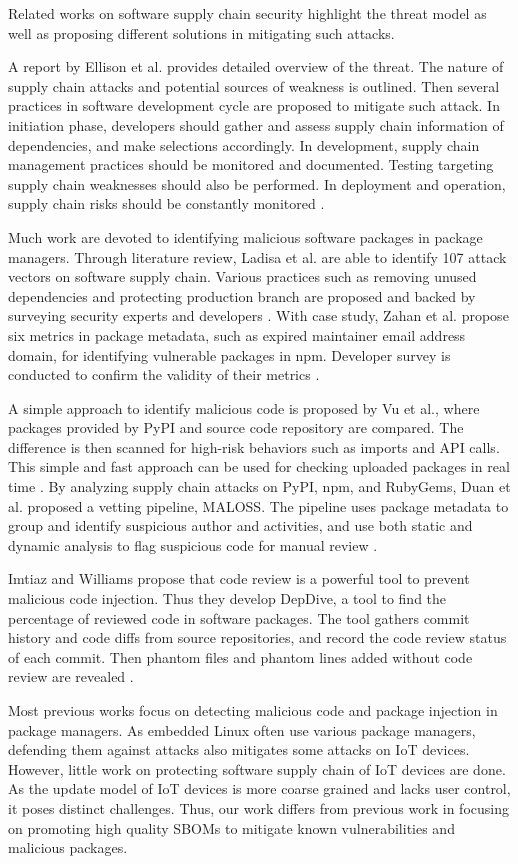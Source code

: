 Related works on software supply chain security highlight the threat model as well as proposing different solutions in mitigating such attacks. \par
A report by Ellison et al. provides detailed overview of the threat. The nature of supply chain attacks and potential sources of weakness is outlined. Then several practices in software development cycle are proposed to mitigate such attack. In initiation phase, developers should gather and assess supply chain information of dependencies, and make selections accordingly. In development, supply chain management practices should be monitored and documented. Testing targeting supply chain weaknesses should also be performed. In deployment and operation, supply chain risks should be constantly monitored \cite{Evaluating_and_Mitigating}. \par
Much work are devoted to identifying malicious software packages in package managers. Through literature review, Ladisa et al. are able to identify 107 attack vectors on software supply chain. Various practices such as removing unused dependencies and protecting production branch are proposed and backed by surveying security experts and developers \cite{Taxonomy}. With case study, Zahan et al. propose six metrics in package metadata, such as expired maintainer email address domain, for identifying vulnerable packages in npm. Developer survey is conducted to confirm the validity of their metrics \cite{What_are_npm}. \par
A simple approach to identify malicious code is proposed by Vu et al., where packages provided by PyPI and source code repository are compared. The difference is then scanned for high-risk behaviors such as imports and API calls. This simple and fast approach can be used for checking uploaded packages in real time \cite{Towards_Using}. By analyzing supply chain attacks on PyPI, npm, and RubyGems, Duan et al. proposed a vetting pipeline, MALOSS. The pipeline uses package metadata to group and identify suspicious author and activities, and use both static and dynamic analysis to flag suspicious code for manual review \cite{Towards_Measure}. \par
Imtiaz and Williams propose that code review is a powerful tool to prevent malicious code injection. Thus they develop DepDive, a tool to find the percentage of reviewed code in software packages. The tool gathers commit history and code diffs from source repositories, and record the code review status of each commit. Then phantom files and phantom lines added without code review are revealed \cite{Phantom_artifacts}. \par
Most previous works focus on detecting malicious code and package injection in package managers. As embedded Linux often use various package managers, defending them against attacks also mitigates some attacks on IoT devices. However, little work on protecting software supply chain of IoT devices are done. As the update model of IoT devices is more coarse grained and lacks user control, it poses distinct challenges. Thus, our work differs from previous work in focusing on promoting high quality SBOMs to mitigate known vulnerabilities and malicious packages.
